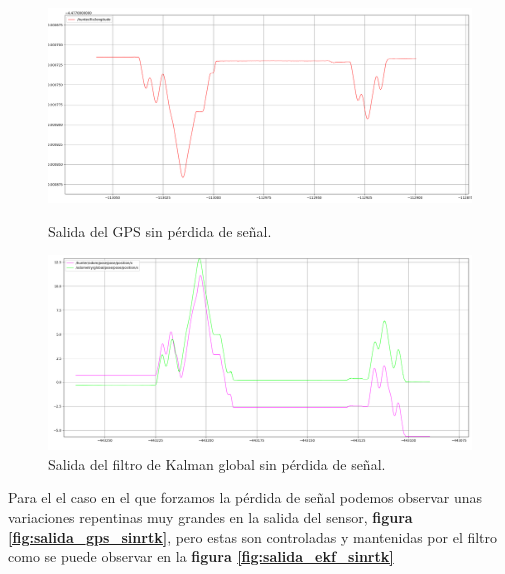 \begin{figure}[htbp]
  \centering
  \begin{minipage}[b]{0.45\textwidth}
    \centering
    \includegraphics[width=\textwidth]{images/longitude_gps.png}
    \caption{Salida del GPS sin pérdida de señal.}
    \label{fig:salida_gps_rtk}
  \end{minipage}
  \hfill
  \begin{minipage}[b]{0.45\textwidth}
    \centering
    \includegraphics[width=\textwidth]{images/odom_global_rtk.png}
    \caption{Salida del filtro de Kalman global sin pérdida de señal.}
    \label{fig:salida_ekf_rtk}
  \end{minipage}
\end{figure}

Para el el caso en el que forzamos la pérdida de señal podemos observar unas variaciones repentinas muy grandes en la salida del sensor, \textbf{figura \ref{fig:salida_gps_sinrtk}}, pero estas son controladas y mantenidas 
por el filtro como se puede observar en la \textbf{figura \ref{fig:salida_ekf_sinrtk}}

